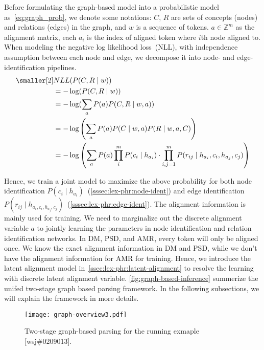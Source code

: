 Before formulating the graph-based model into a probabilistic model
as~\autoref{eq:graph_prob}, we denote some notations: $C$, $R$ are
sets of concepts (nodes) and relations (edges) in the graph, and $w$
is a sequence of tokens.  $a \in {\mathbb{Z}}^m$ as the alignment
matrix, each $a_{i}$ is the index of aligned token where $i$th node
aligned to. When modeling the negative log likelihood loss~(NLL), with
independence assumption between each node and edge, we decompose it
into node- and edge-identification pipelines.
\begin{equation}
  \label{eq:graph_prob}
\begin{aligned} \smaller[2]
 & NLL(P(C,R \mid w)) \\
 & = - \log(P(C,R \mid w)) \\
 & = - \log(\sum_{a}{P(a) P(C,R \mid w,a)}) \\
 & = - \log\left(\sum_{a}P(a) P(C \mid w, a) P(R\mid w,a,C)\right) \\
 & = - \log\left(\sum_{a}P(a) \prod_{i}^{m} P(c_{i} \mid h_{a_{i}}) \cdot \prod_{i,j=1}^{m}P(r_{ij} \mid h_{a_{i}}, c_{i}, h_{a_{j}}, c_{j})\right)
\end{aligned}
\end{equation}

Hence, we train a joint model to maximize the above probability for
both node identification
$P(c_{i} \mid h_{a_{i}})$~(\autoref{sssec:lex-phr:node-ident}) and edge
identification
$P(r_{ij} \mid h_{{a_{i}}, c_{i},h_{a_{j}},
  c_{j}})$~(\autoref{sssec:lex-phr:edge-ident}). The alignment
information is mainly used for training. We need to marginalize out
the discrete alignment variable $a$ to jointly learning the parameters
in node identification and relation identification networks. In DM,
PSD, and AMR, every token will only be aligned once. We know the exact
alignment information in DM and PSD, while we don't have the alignment
information for AMR for training. Hence, we introduce the latent
alignment model in~\autoref{ssec:lex-phr:latent-alignment} to resolve
the learning with discrete latent alignment
variable. \autoref{fig:graph-based-inference} summerize the unifed
two-stage graph based parsing framework. In the following subsections,
we will explain the framework in more details.

\begin{figure}[!tbp]
\begin{center}
  \texttt{[image: graph-overview3.pdf]}
\end{center}
  \caption{\label{fig:graph-based-inference} Two-stage graph-based
    parsing for the running exmaple [wsj\#0209013].}
\end{figure}

